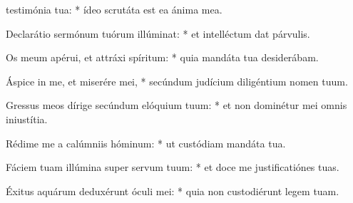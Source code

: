 \begin{psalmus}

 testimónia tua: * ídeo scrutáta est ea ánima mea.

Declarátio sermónum tuórum illúminat: * et intelléctum dat párvulis.

Os meum apérui, et attráxi spíritum: * quia mandáta tua desiderábam.

Áspice in me, et miserére mei, * secúndum judícium diligéntium nomen tuum.

Gressus meos dírige secúndum elóquium tuum: * et non dominétur mei omnis iniustítia.

Rédime me a calúmniis hóminum: * ut custódiam mandáta tua.

Fáciem tuam illúmina super servum tuum: * et doce me justificatiónes tuas.

Éxitus aquárum deduxérunt óculi mei: * quia non custodiérunt legem tuam.

\end{psalmus}
